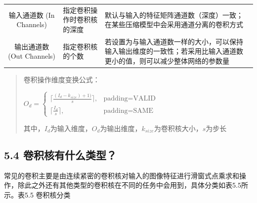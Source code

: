 \begin{longtable}[]{@{}cll@{}}
\begin{minipage}[t]{0.16\columnwidth}\centering\strut
输入通道数 (In Channels)\strut
\end{minipage} & \begin{minipage}[t]{0.38\columnwidth}\raggedright\strut
指定卷积操作时卷积核的深度\strut
\end{minipage} & \begin{minipage}[t]{0.38\columnwidth}\raggedright\strut
默认与输入的特征矩阵通道数（深度）一致；在某些压缩模型中会采用通道分离的卷积方式\strut
\end{minipage}\tabularnewline
\begin{minipage}[t]{0.16\columnwidth}\centering\strut
输出通道数 (Out Channels)\strut
\end{minipage} & \begin{minipage}[t]{0.38\columnwidth}\raggedright\strut
指定卷积核的个数\strut
\end{minipage} & \begin{minipage}[t]{0.38\columnwidth}\raggedright\strut
若设置为与输入通道数一样的大小，可以保持输入输出维度的一致性；若采用比输入通道数更小的值，则可以减少整体网络的参数量\strut
\end{minipage}\tabularnewline
\bottomrule
\end{longtable}

\begin{quote}
卷积操作维度变换公式：

\(O_d =\begin{cases} \lceil \frac{(I_d - k_{size})+ 1)}{s}\rceil ,& \text{padding=VALID}\\ \lceil \frac{I_d}{s}\rceil,&\text{padding=SAME} \end{cases}\)

其中，\(I_d\)为输入维度，\(O_d\)为输出维度，\(k_{size}\)为卷积核大小，\(s\)为步长
\end{quote}

\subsection{5.4
卷积核有什么类型？}\label{ux5377ux79efux6838ux6709ux4ec0ux4e48ux7c7bux578b}

​
常见的卷积主要是由连续紧密的卷积核对输入的图像特征进行滑窗式点乘求和操作，除此之外还有其他类型的卷积核在不同的任务中会用到，具体分类如表5.5所示。
​ 表5.5 卷积核分类

